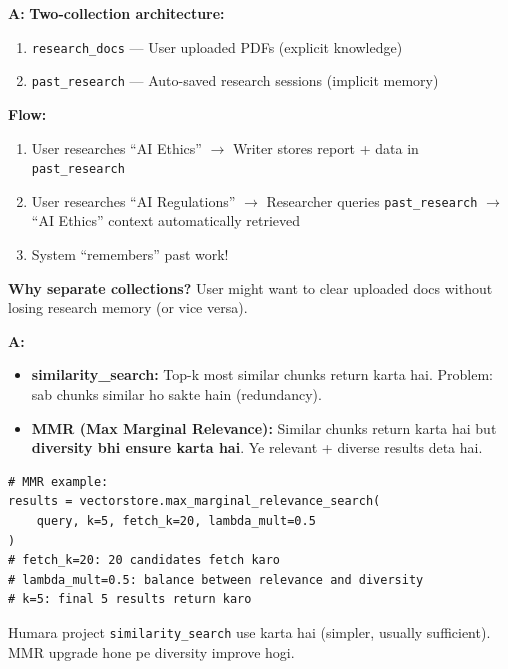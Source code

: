 \documentclass[12pt, a4paper]{article}
\begin{document}
\begin{interviewbox}[title={\faIcon{user-tie} ~Q28: Memory system (past research) ka design explain karo.}]
\textbf{A:} \textbf{Two-collection architecture:}
\begin{enumerate}
\item \texttt{research\_docs} --- User uploaded PDFs (explicit knowledge)
\item \texttt{past\_research} --- Auto-saved research sessions (implicit memory)
\end{enumerate}

\textbf{Flow:}
\begin{enumerate}
\item User researches ``AI Ethics'' $\rightarrow$ Writer stores report + data in \texttt{past\_research}
\item User researches ``AI Regulations'' $\rightarrow$ Researcher queries \texttt{past\_research} $\rightarrow$ ``AI Ethics'' context automatically retrieved
\item System ``remembers'' past work!
\end{enumerate}

\textbf{Why separate collections?} User might want to clear uploaded docs without losing research memory (or vice versa).
\end{interviewbox}

\begin{interviewbox}[title={\faIcon{user-tie} ~Q29: \texttt{similarity\_search} vs \texttt{max\_marginal\_relevance\_search}?}]
\textbf{A:}
\begin{itemize}
\item \textbf{similarity\_search:} Top-k most similar chunks return karta hai. Problem: sab chunks similar ho sakte hain (redundancy).
\item \textbf{MMR (Max Marginal Relevance):} Similar chunks return karta hai but \textbf{diversity bhi ensure karta hai}. Ye relevant + diverse results deta hai.
\end{itemize}

\begin{lstlisting}[style=pythonstyle]
# MMR example:
results = vectorstore.max_marginal_relevance_search(
    query, k=5, fetch_k=20, lambda_mult=0.5
)
# fetch_k=20: 20 candidates fetch karo
# lambda_mult=0.5: balance between relevance and diversity
# k=5: final 5 results return karo
\end{lstlisting}

Humara project \texttt{similarity\_search} use karta hai (simpler, usually sufficient). MMR upgrade hone pe diversity improve hogi.
\end{interviewbox}
\end{document}
